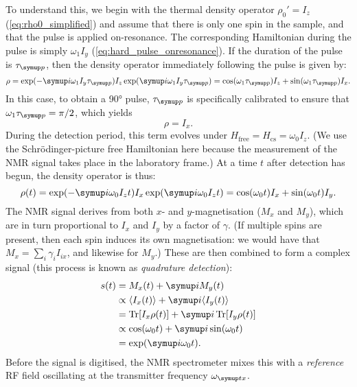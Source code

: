 To understand this, we begin with the thermal density operator $\rho_0' = I_z$ (\cref{eq:rho0_simplified}) and assume that there is only one spin in the sample, and that the pulse is applied on-resonance.
The corresponding Hamiltonian during the pulse is simply $\omega_1 I_y$ (\cref{eq:hard_pulse_onresonance}).
If the duration of the pulse is $\taup$, then the density operator immediately following the pulse is given by:
\begin{equation}
    \label{eq:rho_after_pulse}
    \rho = \exp(-\mi\omega_1 I_y\taup) I_z \exp(\mi\omega_1 I_y\taup) = \cos(\omega_1\taup)I_z + \sin(\omega_1\taup)I_x.
\end{equation}
In this case, to obtain a \ang{90} pulse, $\taup$ is specifically calibrated to ensure that $\omega_1\taup = \pi/2$, which yields
\begin{equation}
    \label{eq:rho_after_pulse_simplified}
    \rho = I_x.
\end{equation}
During the detection period, this term evolves under $H_\text{free} = H_\text{cs} = \omega_0 I_z$.
(We use the Schr\"odinger-picture free Hamiltonian here because the measurement of the NMR signal takes place in the laboratory frame.)
At a time $t$ after detection has begun, the density operator is thus:
\begin{equation}
    \label{eq:rho_during_detection}
    \rho(t) = \exp(-\mi \omega_0 I_z t)I_x\exp(\mi\omega_0 I_z t) = \cos(\omega_0 t)I_x + \sin(\omega_0 t)I_y.
\end{equation}
The NMR signal derives from both $x$- and $y$-magnetisation ($M_x$ and $M_y$), which are in turn proportional to $I_x$ and $I_y$ by a factor of $\gamma$.
(If multiple spins are present, then each spin induces its own magnetisation: we would have that $M_x = \sum_i \gamma_i I_{ix}$, and likewise for $M_y$.)
These are then combined to form a complex signal (this process is known as \textit{quadrature detection}):
\begin{align}
    s(t) &= M_x(t) + \mi M_y(t) \label{eq:quadrature} \\
         &\propto \langle I_x(t) \rangle + \mi \langle I_y(t) \rangle \notag \\
         &= \Tr[I_x\rho(t)] + \mi \Tr[I_y\rho(t)] \notag \\
         &\propto \cos(\omega_0 t) + \mi \sin(\omega_0 t) \notag \\
         &= \exp(\mi \omega_0 t). \label{eq:fid}
\end{align}
Before the signal is digitised, the NMR spectrometer mixes this with a \textit{reference} RF field oscillating at the transmitter frequency $\omegatx$.
